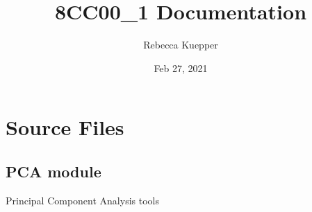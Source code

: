 \documentclass[letterpaper,10pt,english]{sphinxmanual}
\title{8CC00\_1 Documentation}
\date{Feb 27, 2021}
\author{Rebecca Kuepper}
\begin{document}
\pagestyle{empty}
\sphinxmaketitle
\pagestyle{plain}
\sphinxtableofcontents
\pagestyle{normal}
\label{\detokenize{index::doc}}



\chapter{Source Files}
\label{\detokenize{modules:source-files}}\label{\detokenize{modules::doc}}

\section{PCA module}
\label{\detokenize{AssignmentPCA:module-AssignmentPCA}}\label{\detokenize{AssignmentPCA:pca-module}}\label{\detokenize{AssignmentPCA::doc}}
\sphinxAtStartPar
Principal Component Analysis tools
\end{document}
